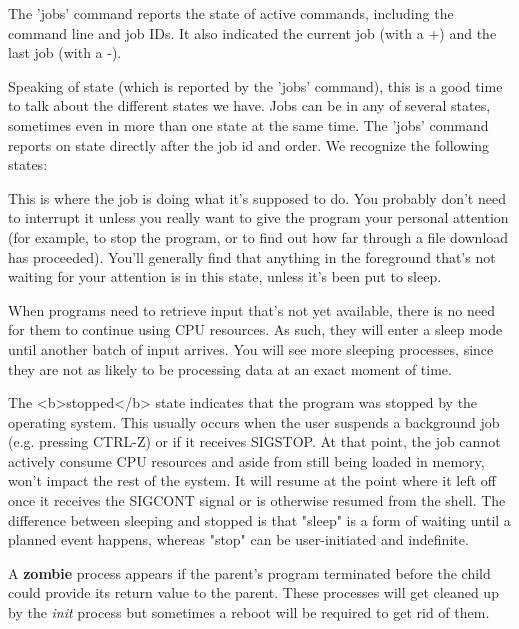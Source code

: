 The 'jobs' command reports the state of active commands, including the command
line and job IDs. It also indicated the current job (with a +) and the last job
(with a -).

Speaking of state (which is reported by the 'jobs' command), this is a good
time to talk about the different states we have. Jobs can be in any of several
states, sometimes even in more than one state at the same time. The 'jobs'
command reports on state directly after the job id and order. We recognize the
following states:

\begin{description}
\setlength{\leftmargin}{0pt}
\setlength{\itemsep}{0pt}
\setlength{\parsep}{0pt}
\setlength{\parskip}{0pt}
\item[Running] This is where the job is doing what it's supposed to do. You
probably don't need to interrupt it unless you really want to give the program
your personal attention (for example, to stop the program, or to find out how
far through a file download has proceeded). You'll generally find that anything
in the foreground that's not waiting for your attention is in this state,
unless it's been put to sleep.
\item[Sleeping] When programs need to retrieve input that's not yet available,
there is no need for them to continue using CPU resources. As such, they will
enter a sleep mode until another batch of input arrives. You will see more
sleeping processes, since they are not as likely to be processing data at an
exact moment of time.  
\item[Stopped] The <b>stopped</b> state indicates that the program was stopped
by the operating system.  This usually occurs when the user suspends a
background job (e.g. pressing CTRL-Z) or if it receives SIGSTOP.  At that
point, the job cannot actively consume CPU resources and aside from still being
loaded in memory, won't impact the rest of the system.  It will resume at the
point where it left off once it receives the SIGCONT signal or is otherwise
resumed from the shell. The difference between sleeping and stopped is that
"sleep" is a form of waiting until a planned event happens, whereas "stop" can
be user-initiated and indefinite.
\item[Zombie] A \textbf{zombie} process appears if the parent's program
terminated before the child could provide its return value to the parent.
These processes will get cleaned up by the \textit{init} process but sometimes
a reboot will be required to get rid of them.
\end{description}

